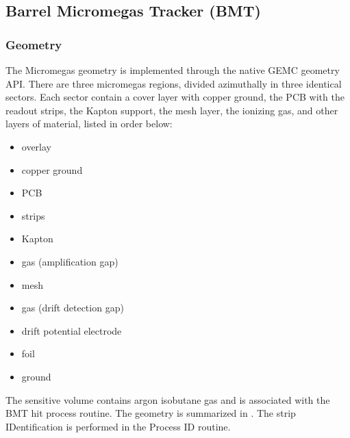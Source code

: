 \subsection{Barrel Micromegas Tracker (BMT)}

\subsubsection{Geometry}

The Micromegas geometry is implemented through the native GEMC geometry API.
There are three micromegas regions, divided azimuthally in three identical sectors. Each sector contain a cover layer with copper ground,
the PCB with the readout strips, the Kapton support, the mesh layer, the ionizing gas, and other layers of material, listed in order below:

\begin{itemize}
	\item overlay
	\item copper ground
	\item PCB
	\item strips
	\item Kapton
	\item gas (amplification gap)
	\item mesh
	\item gas (drift detection gap)
	\item drift potential electrode
	\item foil
	\item ground
\end{itemize}

The sensitive volume contains argon isobutane gas and is associated with the BMT hit process routine.
The geometry is summarized in . The strip IDentification is performed in the Process ID routine.

